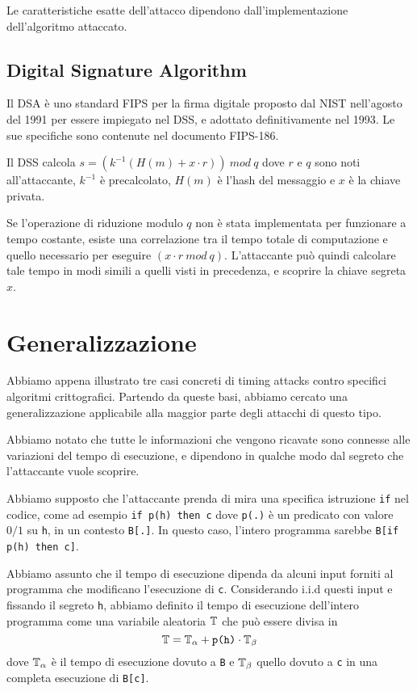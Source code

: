 		Le caratteristiche esatte dell'attacco dipendono dall'implementazione dell'algoritmo attaccato.
		
		\subsection{Digital Signature Algorithm}
		Il \ac{DSA} è uno standard \ac{FIPS} per la firma digitale proposto dal \ac{NIST} nell'agosto del 1991 per essere impiegato nel \ac{DSS}, e adottato definitivamente nel 1993. Le sue specifiche sono contenute nel documento \ac{FIPS}-186\cite{kravitz1993digital}.
		
		Il \ac{DSS} calcola $s = (k^{-1}(H(m) + x \cdot r)) \ mod \ q$ dove $r$ e $q$ sono noti all'attaccante, $k^{-1}$ è precalcolato, $H(m)$ è l'hash del messaggio e $x$ è la chiave privata.
		
		Se l'operazione di riduzione modulo $q$ non è stata implementata per funzionare a tempo costante, esiste una correlazione tra il tempo totale di computazione e quello necessario per eseguire $(x \cdot r \ mod \ q)$. L'attaccante può quindi calcolare tale tempo in modi simili a quelli visti in precedenza, e scoprire la chiave segreta $x$.
		
	\section{Generalizzazione}
	Abbiamo appena illustrato tre casi concreti di timing attacks contro specifici algoritmi crittografici. Partendo da queste basi, abbiamo cercato una generalizzazione applicabile alla maggior parte degli attacchi di questo tipo.
	
	Abbiamo notato che tutte le informazioni che vengono ricavate sono connesse alle variazioni del tempo di esecuzione, e dipendono in qualche modo dal segreto che l'attaccante vuole scoprire.
	
	Abbiamo supposto che l'attaccante prenda di mira una specifica istruzione \texttt{if} nel codice, come ad esempio \texttt{if p(h) then c} dove \texttt{p(.)} è un predicato con valore $0/1$ su \texttt{h}, in un contesto \texttt{B[.]}. In questo caso, l'intero programma sarebbe \texttt{B[if p(h) then c]}.
	
	Abbiamo assunto che il tempo di esecuzione dipenda da alcuni input forniti al programma che modificano l'esecuzione di \texttt{c}. Considerando i.i.d questi input e fissando il segreto \texttt{h}, abbiamo definito il tempo di esecuzione dell'intero programma come una variabile aleatoria $\mathbb{T}$ che può essere divisa in \begin{equation} \label{eq:1}
		\mathbb{T} = \mathbb{T}_{\alpha} + \text{\texttt{p(h)}}\cdot \mathbb{T}_{\beta}
	\end{equation} 
	dove $\mathbb{T}_{\alpha}$ è il tempo di esecuzione dovuto a \texttt{B} e $\mathbb{T}_{\beta}$ quello dovuto a \texttt{c} in una completa esecuzione di \texttt{B[c]}.
	

